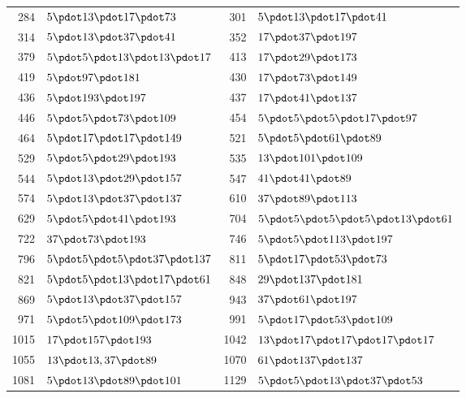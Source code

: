 \begin{longtable}{@{}r|l@{\qquad}r|l@{}}
284 & $5\pdot 13\pdot 17\pdot 73$ & 301 & $5\pdot 13\pdot 17\pdot 41$\\
314 & $5\pdot 13\pdot 37\pdot 41$ & 352 & $17\pdot 37\pdot 197$\\
379 & $5\pdot 5\pdot 13\pdot 13\pdot 17$ & 413 & $17\pdot 29\pdot 173$\\
419 & $5\pdot 97\pdot 181$ & 430 & $17\pdot 73\pdot 149$\\
436 & $5\pdot 193\pdot 197$ & 437 & $17\pdot 41\pdot 137$\\
446 & $5\pdot 5\pdot 73\pdot 109$ & 454 & $5\pdot 5\pdot 5\pdot 17\pdot 97$\\
464 & $5\pdot 17\pdot 17\pdot 149$ & 521 & $5\pdot 5\pdot 61\pdot 89$\\
529 & $5\pdot 5\pdot 29\pdot 193$ & 535 & $13\pdot 101\pdot 109$\\
544 & $5\pdot 13\pdot 29\pdot 157$ & 547 & $41\pdot 41\pdot 89$\\
574 & $5\pdot 13\pdot 37\pdot 137$ & 610 & $37\pdot 89\pdot 113$\\
629 & $5\pdot 5\pdot 41\pdot 193$ & 704 & $5\pdot 5\pdot 5\pdot 5\pdot 13\pdot 61$\\
722 & $37\pdot 73\pdot 193$ & 746 & $5\pdot 5\pdot 113\pdot 197$\\
796 & $5\pdot 5\pdot 5\pdot 37\pdot 137$ & 811 & $5\pdot 17\pdot 53\pdot 73$\\
821 & $5\pdot 5\pdot 13\pdot 17\pdot 61$ & 848 & $29\pdot 137\pdot 181$\\
869 & $5\pdot 13\pdot 37\pdot 157$ & 943 & $37\pdot 61\pdot 197$\\
971 & $5\pdot 5\pdot 109\pdot 173$ & 991 & $5\pdot 17\pdot 53\pdot 109$\\
1015 & $17\pdot 157\pdot 193$ & 1042 & $13\pdot 17\pdot 17\pdot 17\pdot 17$\\
1055 & $13\pdot 13,37\pdot 89$ & 1070 & $61\pdot 137\pdot 137$\\
1081 & $5\pdot 13\pdot 89\pdot 101$ & 1129 & $5\pdot 5\pdot 13\pdot 37\pdot 53$\\
\end{longtable}\endgroup
